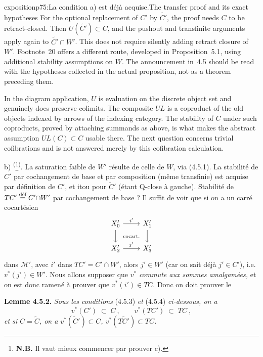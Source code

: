 \begin{dcomment}{exposition}{p75:La condition a) est déjà acquise.}{The transfer proof and its exact hypotheses}
For the optional replacement of $C'$ by $\widetilde{C'}$, the proof needs $C$ to be retract-closed. Then $U(\widetilde{C'})\subset C$, and the pushout and transfinite arguments apply again to $\widetilde{C'}\cap W'$. This does not require silently adding retract closure of $W'$. Footnote~20 offers a different route, developed in Proposition~5.1, using additional stability assumptions on $W$. The announcement in~4.5 should be read with the hypotheses collected in the actual proposition, not as a theorem preceding them.

In the diagram application, $U$ is evaluation on the discrete object set and genuinely does preserve colimits. The composite $UL$ is a coproduct of the old objects indexed by arrows of the indexing category. The stability of $C$ under such coproducts, proved by attaching summands as above, is what makes the abstract assumption $UL(C)\subset C$ usable there. The next question concerns trivial cofibrations and is not answered merely by this cofibration calculation.
\end{dcomment}


b) \textsuperscript{(}\footnote[19]{\textbf{N.B.} Il vaut mieux commencer par prouver c).}\textsuperscript{)}. La saturation faible de $W'$ résulte de celle de $W$, via (4.5.1). La stabilité de $C'$ par cochangement de base et par composition (même transfinie) est acquise par définition de $C'$, et itou pour $\tilde{C}'$ (étant Q-close à gauche). Stabilité de $TC' \defeq C'{\cap}W'$ par cochangement de base ? Il suffit de voir que si on a un carré cocartésien
\[
\begin{tikzcd}
X'_0 \arrow[r, "i'"] \arrow[d] \arrow[dr, phantom, "\text{\scriptsize cocart.}"] & X'_1 \arrow[d] \\
X'_2 \arrow[r, "j'"] & X'_3
\end{tikzcd}
\]
dans $\mathcal{M}'$, avec $i'$ dans $TC' = C' \cap W'$, alors $j' \in W'$ (car on sait déjà $j' \in C'$), i.e.
\marginpar{$||$}%
$v^*(j') \in W'$. Nous allons supposer que $v^*$ \textit{commute aux sommes amalgamées,} et on est donc ramené à prouver que $v^*(i') \in TC$. Donc %
on doit prouver le

\textbf{Lemme 4.5.2.} \textit{Sous les conditions} (4.5.3) \textit{et} (4.5.4) \textit{ci-dessous, on a}
\[
v^*(C') \;\subset\; C\ , \qquad v^*(TC') \;\subset\; TC\ ,
\]
\textit{et si $C = \tilde{C}$, on a $v^*(\tilde{C}') \subset C$, $v^*(T\tilde{C}') \subset TC$.}

